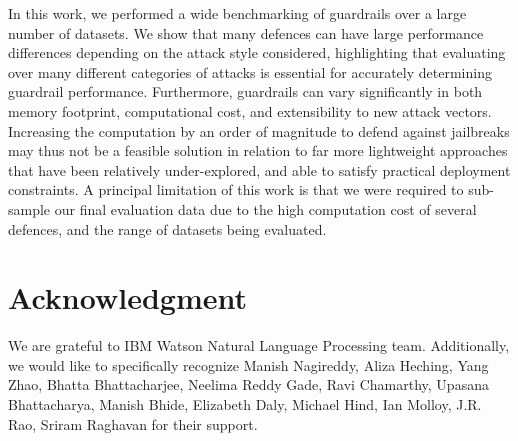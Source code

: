 In this work, we performed a wide benchmarking of guardrails  over a large number of datasets. We show that many defences can have large performance differences depending on the attack style considered, highlighting that evaluating over many different categories of attacks is essential for accurately determining guardrail performance. Furthermore, guardrails can vary significantly in both memory footprint, computational cost, and extensibility to new attack vectors. Increasing the computation by an order of magnitude to defend against jailbreaks may thus not be a feasible solution in relation to far more lightweight approaches that have been relatively under-explored, and able to satisfy practical deployment constraints. A principal limitation of this work is that we were required to sub-sample our final evaluation data due to the high computation cost of several defences, and the range of datasets being evaluated.

\section{Acknowledgment}

We are grateful to IBM Watson Natural Language Processing team. Additionally, we would like to specifically recognize Manish Nagireddy, Aliza Heching, Yang Zhao, Bhatta Bhattacharjee, Neelima Reddy Gade, Ravi Chamarthy, Upasana Bhattacharya, Manish Bhide, Elizabeth Daly, Michael Hind, Ian Molloy, J.R. Rao, Sriram Raghavan for their support.